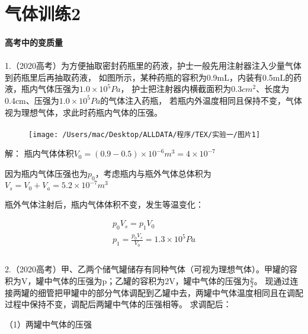 \documentclass[UTF8]{ctexart}
\begin{document}
\section*{气体训练2}
\paragraph{高考中的变质量}
\kaishu{}
\paragraph{}
    1.（2020高考）为方便抽取密封药瓶里的药液，护士一般先用注射器注入少量气体到药瓶里后再抽取药液，
如图所示，某种药瓶的容积为0.9mL，内装有0.5mL的药液，瓶内气体压强为$1.0 \times 10^{5}Pa$，
护士把注射器内横截面积为$0.3cm^{2}$、长度为0.4cm、压强为$1.0 \times 10^{5}Pa$的气体注入药瓶，
若瓶内外温度相同且保持不变，气体视为理想气体，求此时药瓶内气体的压强。

\begin{figure}[htbp]
\paragraph{} \texttt{[image: /Users/mac/Desktop/ALLDATA/程序/TEX/实验一/图片1]}\label{fig:figure}
\end{figure}
解：
瓶内气体体积$V_{0} = (0.9-0.5) \times 10^{-6} m^{3} = 4 \times 10^{-7}$

因为瓶内气体压强也为$p_{0}$，考虑瓶内与瓶外气体总体积为$V_{s} = V_{0} + V_{a} = 5.2 \times 10^{-7} m^{3}$

瓶外气体注射后，瓶内气体体积不变，发生等温变化：

\begin{gather*}
    p_{0}  V_{s} = p_{1}  V_{0}\\
    p_{1} = \frac{p_{0}V_{s}}{V_{0}} = 1.3 \times 10^{5}Pa\\
\end{gather*}


\paragraph{}
    2.（2020高考）甲、乙两个储气罐储存有同种气体（可视为理想气体）。甲罐的容积为V，罐中气体的压强为p；乙罐的容积为2V，罐中气体的压强为$\frac{p}{2}$。
    现通过连接两罐的细管把甲罐中的部分气体调配到乙罐中去，两罐中气体温度相同且在调配过程中保持不变，调配后两罐中气体的压强相等。
    求调配后：

    （1）两罐中气体的压强
\end{document}
